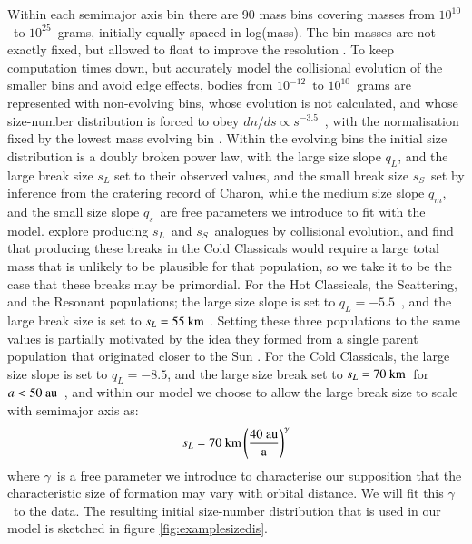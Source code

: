 \documentclass[printer]{aa}
\begin{document}
Within each semimajor axis bin there are 90 mass bins covering masses from $10^{10}$~to $10^{25}$~grams, initially equally spaced in log(mass).  The bin masses are not exactly fixed, but allowed to float to improve the resolution \citep[as in, e.g.,][and our implementation is the one tested in detail in \citet{2015ApJ...801...15S}]{1998AJ....115.2136K}.  To keep computation times down, but accurately model the collisional evolution of the smaller bins and avoid edge effects, bodies from $10^{-12}$~to $10^{10}$~grams are represented with non-evolving bins, whose evolution is not calculated, and whose size-number distribution is forced to obey $dn/ds \propto s^{-3.5}$~\citep{1969JGR....74.2531D}, with the normalisation fixed by the lowest mass evolving bin \citep[somewhat analogous to the procedure used in, e.g.,][]{2008ApJS..179..451K}.  Within the evolving bins the initial size distribution is a doubly broken power law, with the large size slope $q_L$, and the large break size $s_L$ set to their observed values, and the small break size $s_S$~set by inference from the cratering record of Charon, while the medium size slope $q_m$, and the small size slope $q_s$~are free parameters we introduce to fit with the model.  \citet{2020PSJ.....1...40K} explore producing $s_L$~and $s_S$~analogues by collisional evolution, and find that producing these breaks in the Cold Classicals would require a large total mass that is unlikely to be plausible for that population, so we take it to be the case that these breaks may be primordial.  For the Hot Classicals, the Scattering, and the Resonant populations; the large size slope is set to $q_L = -5.5$~\citep{2016AJ....152...23V}, and the large break size is set to $s_L = 55~\rm{km}$ \citep{2014ApJ...782..100F}.  Setting these three populations to the same values is partially motivated by the idea they formed from a single parent population that originated closer to the Sun \citep{2008Icar..196..258L}.  For the Cold Classicals, the large size slope is set to $q_L = -8.5$, and the large size break set to $s_L = 70~\rm{km}$~for $a < 50~\rm{au}$~\citep{2014ApJ...782..100F}, and within our model we choose to allow the large break size to scale with semimajor axis as:
\begin{equation}
    s_L = 70~\rm{km} \left(\frac{40~\rm{au}}{a}\right)^{\gamma}
    \label{eq:sl}
\end{equation}
where $\gamma$~is a free parameter we introduce to characterise our supposition that the characteristic size of formation may vary with orbital distance.  We will fit this $\gamma$~to the data.  The resulting initial size-number distribution that is used in our model is sketched in figure \ref{fig:examplesizedis}.
\end{document}
